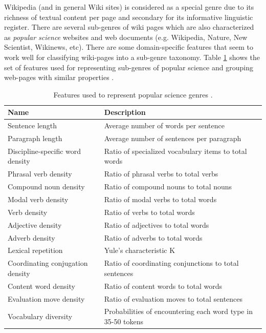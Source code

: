 Wikipedia (and in general Wiki sites) is considered as a special genre due to its richness of textual content per page and secondary for its informative linguistic register. There are several sub-genres of wiki pages which are also characterized as \textit{popular science} websites and web documents (e.g. Wikipedia, Nature, New Scientist, Wikinews, etc). There are some domain-specific features that seem to work well for classifying wiki-pages into a sub-genre taxonomy. Table \ref{chap:relevant_work:tbl:pop_science_features} shows the set of features used for representing sub-genres of popular science and grouping web-pages with similar properties \parencite{lieungnapar2017genre}.  

\begin{table}[t]
	\center
	\caption {Features used to represent popular science genres \parencite{lieungnapar2017genre}.}\label{chap:relevant_work:tbl:pop_science_features}
	\begin{tabular}{p{4cm}p{8cm}}
		\hline
		Name & Description \\
		\hline
		Sentence length & Average number of words per sentence \\
        Paragraph length & Average number of sentences per paragraph \\
        Discipline-specific word density & Ratio of specialized vocabulary items to total words \\
        Phrasal verb density & Ratio of phrasal verbs to total verbs \\
        Compound noun density & Ratio of compound nouns to total nouns \\
        Modal verb density & Ratio of modal verbs to total words \\
        Verb density &  Ratio of verbs to total words \\
        Adjective density & Ratio of adjectives to total words \\
        Adverb density & Ratio of adverbs to total words \\
        Lexical repetition & Yule's characteristic K \\
        Coordinating conjugation density & Ratio of coordinating conjunctions to total sentences \\
        Content word density & Ratio of content words to total words \\
        Evaluation move density & Ratio of evaluation moves to total sentences \\
        Vocabulary diversity & Probabilities of encountering each word type in 35-50 tokens \\

\end{tabular}
\end{table}
